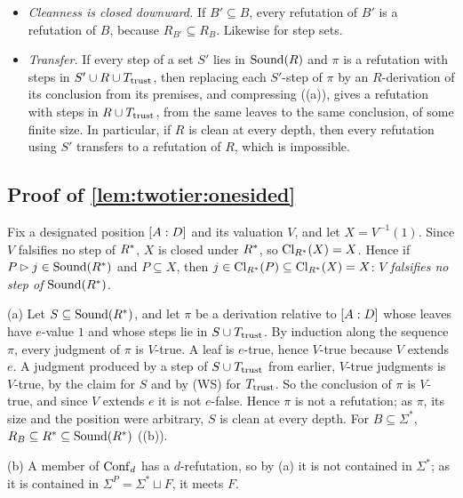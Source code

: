 \begin{itemize}[leftmargin=*]
\item[(F1)] \emph{Cleanness is closed downward.} If $B'\subseteq B$, every refutation of $B'$ is a refutation of $B$, because $R_{B'}\subseteq R_B$. Likewise for step sets.
\item[(F2)] \emph{Transfer.} If every step of a set $S'$ lies in $\mathrm{Sound}(R)$ and $\pi$ is a refutation with steps in $S'\cup R\cup T_{\mathrm{trust}}$, then replacing each $S'$-step of $\pi$ by an $R$-derivation of its conclusion from its premises, and compressing ((a)), gives a refutation with steps in $R\cup T_{\mathrm{trust}}$, from the same leaves to the same conclusion, of some finite size. In particular, if $R$ is clean at every depth, then every refutation using $S'$ transfers to a refutation of $R$, which is impossible.
\end{itemize}

\subsection{Proof of \texorpdfstring{\cref{lem:twotier:onesided}}{the one-sidedness lemma}}\label{app:twotier:onesided}

Fix a designated position $[A : D]$ and its valuation $V$, and let $X=V^{-1}(1)$. Since $V$ falsifies no step of $R^{*}$, $X$ is closed under $R^{*}$, so $\mathrm{Cl}_{R^{*}}(X)=X$. Hence if $P\rhd j\in\mathrm{Sound}(R^{*})$ and $P\subseteq X$, then $j\in\mathrm{Cl}_{R^{*}}(P)\subseteq\mathrm{Cl}_{R^{*}}(X)=X$: \emph{$V$ falsifies no step of $\mathrm{Sound}(R^{*})$}.

(a) Let $S\subseteq\mathrm{Sound}(R^{*})$, and let $\pi$ be a derivation relative to $[A : D]$ whose leaves have $e$-value $1$ and whose steps lie in $S\cup T_{\mathrm{trust}}$. By induction along the sequence $\pi$, every judgment of $\pi$ is $V$-true. A leaf is $e$-true, hence $V$-true because $V$ extends $e$. A judgment produced by a step of $S\cup T_{\mathrm{trust}}$ from earlier, $V$-true judgments is $V$-true, by the claim for $S$ and by (WS) for $T_{\mathrm{trust}}$. So the conclusion of $\pi$ is $V$-true, and since $V$ extends $e$ it is not $e$-false. Hence $\pi$ is not a refutation; as $\pi$, its size and the position were arbitrary, $S$ is clean at every depth. For $B\subseteq\Sigma^*$, $R_B\subseteq R^{*}\subseteq\mathrm{Sound}(R^{*})$ ((b)).

(b) A member of $\mathrm{Conf}_d$ has a $d$-refutation, so by (a) it is not contained in $\Sigma^*$; as it is contained in $\Sigma^P=\Sigma^*\sqcup F$, it meets $F$.


